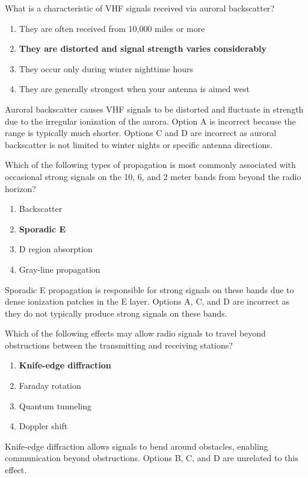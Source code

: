 
\begin{tcolorbox}[colback=gray!10!white,colframe=black!75!black,title={T3C03}]
    What is a characteristic of VHF signals received via auroral backscatter?
    \begin{enumerate}[label=\Alph*),noitemsep]
        \item They are often received from 10,000 miles or more
        \item \textbf{They are distorted and signal strength varies considerably}
        \item They occur only during winter nighttime hours
        \item They are generally strongest when your antenna is aimed west
    \end{enumerate}
\end{tcolorbox}
Auroral backscatter causes VHF signals to be distorted and fluctuate in strength due to the irregular ionization of the aurora. Option A is incorrect because the range is typically much shorter. Options C and D are incorrect as auroral backscatter is not limited to winter nights or specific antenna directions.


\begin{tcolorbox}[colback=gray!10!white,colframe=black!75!black,title={T3C04}]
    Which of the following types of propagation is most commonly associated with occasional strong signals on the 10, 6, and 2 meter bands from beyond the radio horizon?
    \begin{enumerate}[label=\Alph*),noitemsep]
        \item Backscatter
        \item \textbf{Sporadic E}
        \item D region absorption
        \item Gray-line propagation
    \end{enumerate}
\end{tcolorbox}
Sporadic E propagation is responsible for strong signals on these bands due to dense ionization patches in the E layer. Options A, C, and D are incorrect as they do not typically produce strong signals on these bands.


\begin{tcolorbox}[colback=gray!10!white,colframe=black!75!black,title={T3C05}]
    Which of the following effects may allow radio signals to travel beyond obstructions between the transmitting and receiving stations?
    \begin{enumerate}[label=\Alph*),noitemsep]
        \item \textbf{Knife-edge diffraction}
        \item Faraday rotation
        \item Quantum tunneling
        \item Doppler shift
    \end{enumerate}
\end{tcolorbox}
Knife-edge diffraction allows signals to bend around obstacles, enabling communication beyond obstructions. Options B, C, and D are unrelated to this effect.

